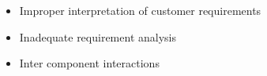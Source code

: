 \label{sec:risks}
\begin{itemize}
	
\item Improper interpretation of customer requirements 
\item Inadequate requirement analysis 
\item Inter component interactions 
\end{itemize}